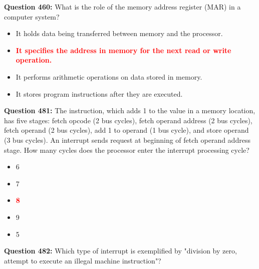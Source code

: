 \documentclass[12pt,a4paper]{article}
\begin{document}
\vspace{0.5cm}

\vspace{0.5cm}

\vspace{0.5cm}

\vspace{0.5cm}

\textbf{Question 460:} What is the role of the memory address register (MAR) in a computer system?

\begin{itemize}
    \item[\textbf{A.}] It holds data being transferred between memory and the processor.
    \item[\textbf{B.}] \textcolor{red}{\textbf{It specifies the address in memory for the next read or write operation.}}
    \item[\textbf{C.}] It performs arithmetic operations on data stored in memory.
    \item[\textbf{D.}] It stores program instructions after they are executed.
\end{itemize}

\vspace{0.5cm}

\vspace{0.5cm}

\textbf{Question 481:} The instruction, which adds 1 to the value in a memory location, has five stages: fetch opcode (2 bus cycles), fetch operand address (2 bus cycles), fetch operand (2 bus cycles), add 1 to operand (1 bus cycle), and store operand (3 bus cycles). An interrupt sends request at beginning of fetch operand address stage. How many cycles does the processor enter the interrupt processing cycle?

\begin{itemize}
    \item[\textbf{A.}] 6
    \item[\textbf{B.}] 7
    \item[\textbf{C.}] \textcolor{red}{\textbf{8}}
    \item[\textbf{D.}] 9
    \item[\textbf{E.}] 5
\end{itemize}

\vspace{0.5cm}

\vspace{0.5cm}

\textbf{Question 482:} Which type of interrupt is exemplified by "division by zero, attempt to execute an illegal machine instruction"?
\end{document}
